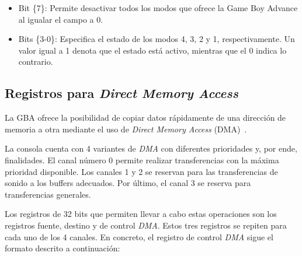 {\begin{itemize}
	\item Bit \{7\}: Permite desactivar todos los modos que ofrece la Game Boy Advance al igualar el campo a 0.
	\item Bits \{3-0\}: Especifica el estado de los modos 4, 3, 2 y 1, respectivamente. Un valor igual a 1 denota que el estado está activo, mientras que el 0 indica lo contrario.
\end{itemize}

\subsection{Registros para \textit{Direct Memory Access}}
La GBA ofrece la posibilidad de copiar datos rápidamente de una dirección de memoria a otra mediante el uso de \textit{Direct Memory Access} (DMA)~\cite{bib:dma_book}.

La consola cuenta con 4 variantes de \textit{DMA} con diferentes prioridades y, por ende, finalidades. El canal número 0 permite realizar transferencias con la máxima prioridad disponible. Los canales 1 y 2 se reservan para las transferencias de sonido a los buffers adecuados. Por último, el canal 3 se reserva para transferencias generales.

Los registros de 32 bits que permiten llevar a cabo estas operaciones son los registros fuente, destino y de control \textit{DMA}. Estos tres registros se repiten para cada uno de los 4 canales. En concreto, el registro de control \textit{DMA} sigue el formato descrito a continuación:

}
